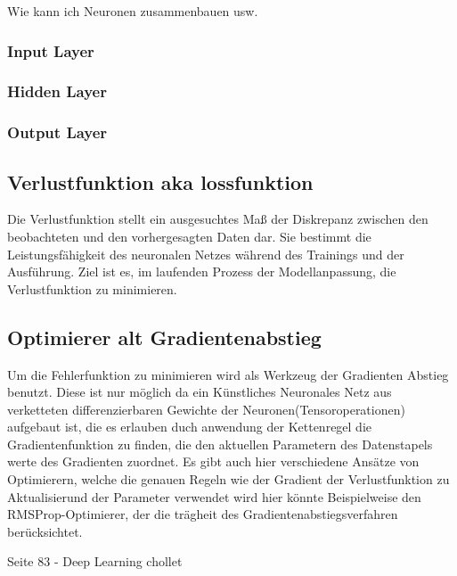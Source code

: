 Wie kann ich Neuronen zusammenbauen usw.

\subsubsection{Input Layer}

\subsubsection{Hidden Layer}

\subsubsection{Output Layer}

\subsection{Verlustfunktion aka lossfunktion}
Die Verlustfunktion stellt ein ausgesuchtes Maß der Diskrepanz zwischen den beobachteten und den vorhergesagten Daten dar. Sie bestimmt die Leistungsfähigkeit des neuronalen Netzes während des Trainings und der Ausführung. Ziel ist es, im laufenden Prozess der Modellanpassung, die Verlustfunktion zu minimieren.

\subsection{Optimierer alt Gradientenabstieg}
Um die Fehlerfunktion zu minimieren wird als Werkzeug der Gradienten Abstieg benutzt. Diese ist nur möglich da ein Künstliches Neuronales Netz aus verketteten differenzierbaren Gewichte der Neuronen(Tensoroperationen) aufgebaut ist, die es erlauben duch anwendung der Kettenregel die Gradientenfunktion zu finden, die den aktuellen Parametern des Datenstapels werte des Gradienten zuordnet. Es gibt auch hier verschiedene Ansätze von Optimierern, welche die genauen Regeln wie der Gradient der Verlustfunktion zu Aktualisierund der Parameter verwendet wird hier könnte Beispielweise den RMSProp-Optimierer, der die trägheit des Gradientenabstiegsverfahren berücksichtet.

Seite 83 - Deep Learning chollet

